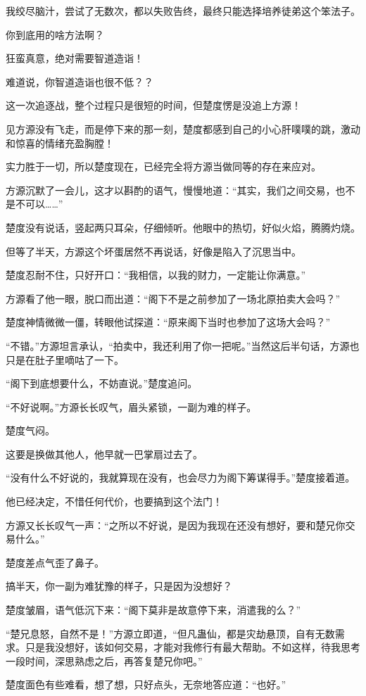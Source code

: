 \begin{this_body}
我绞尽脑汁，尝试了无数次，都以失败告终，最终只能选择培养徒弟这个笨法子。

你到底用的啥方法啊？

狂蛮真意，绝对需要智道造诣！

难道说，你智道造诣也很不低？？

这一次追逐战，整个过程只是很短的时间，但楚度愣是没追上方源！

见方源没有飞走，而是停下来的那一刻，楚度都感到自己的小心肝噗噗的跳，激动和惊喜的情绪充盈胸膛！

实力胜于一切，所以楚度现在，已经完全将方源当做同等的存在来应对。

方源沉默了一会儿，这才以斟酌的语气，慢慢地道：“其实，我们之间交易，也不是不可以……”

楚度没有说话，竖起两只耳朵，仔细倾听。他眼中的热切，好似火焰，腾腾灼烧。

但等了半天，方源这个坏蛋居然不再说话，好像是陷入了沉思当中。

楚度忍耐不住，只好开口：“我相信，以我的财力，一定能让你满意。”

方源看了他一眼，脱口而出道：“阁下不是之前参加了一场北原拍卖大会吗？”

楚度神情微微一僵，转眼他试探道：“原来阁下当时也参加了这场大会吗？”

“不错。”方源坦言承认，“拍卖中，我还利用了你一把呢。”当然这后半句话，方源也只是在肚子里嘀咕了一下。

“阁下到底想要什么，不妨直说。”楚度追问。

“不好说啊。”方源长长叹气，眉头紧锁，一副为难的样子。

楚度气闷。

这要是换做其他人，他早就一巴掌扇过去了。

“没有什么不好说的，我就算现在没有，也会尽力为阁下筹谋得手。”楚度接着道。

他已经决定，不惜任何代价，也要搞到这个法门！

方源又长长叹气一声：“之所以不好说，是因为我现在还没有想好，要和楚兄你交易什么。”

楚度差点气歪了鼻子。

搞半天，你一副为难犹豫的样子，只是因为没想好？

楚度皱眉，语气低沉下来：“阁下莫非是故意停下来，消遣我的么？”

“楚兄息怒，自然不是！”方源立即道，“但凡蛊仙，都是灾劫悬顶，自有无数需求。只是我没想好，该如何交易，才能对我修行有最大帮助。不如这样，待我思考一段时间，深思熟虑之后，再答复楚兄你吧。”

楚度面色有些难看，想了想，只好点头，无奈地答应道：“也好。”

\end{this_body}

